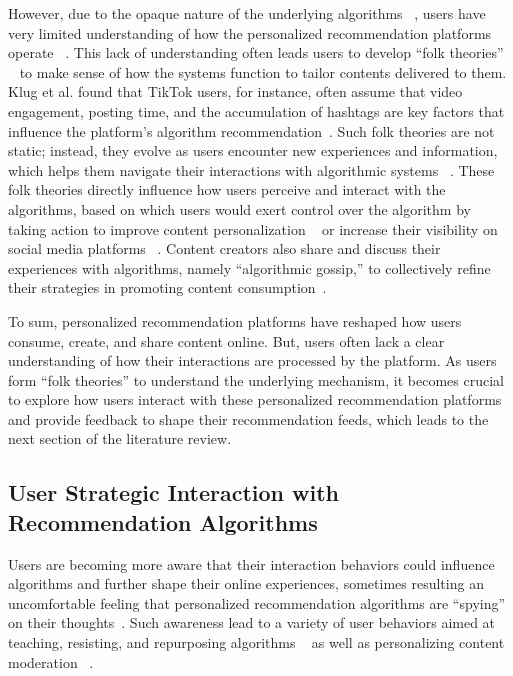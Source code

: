 However, due to the opaque nature of the underlying algorithms ~\cite{gillespie2014relevance, pasquale2011restoring}, users have very limited understanding of how the personalized recommendation platforms operate ~\cite{eslami2015always}. This lack of understanding often leads users to develop ``folk theories'' ~\cite{devito2017algorithms, eslami2016first, ngo2022exploring, bucher2016algorithmic} to make sense of how the systems function to tailor contents delivered to them. Klug et al. found that TikTok users, for instance, often assume that video engagement, posting time, and the accumulation of hashtags are key factors that influence the platform's algorithm recommendation~\cite{klug2021trick}. Such folk theories are not static; instead, they evolve as users encounter new experiences and information, which helps them navigate their interactions with algorithmic systems ~\cite{devito2018people}. These folk theories directly influence how users perceive and interact with the algorithms, based on which users would exert control over the algorithm by taking action to improve content personalization ~\cite{haupt2023recommending} or increase their visibility on social media platforms ~\cite{burrell2019users, bucher2018cleavage}. Content creators also share and discuss their experiences with algorithms, namely ``algorithmic gossip,'' to collectively refine their strategies in promoting content consumption~\cite{bishop2019managing}. 

To sum, personalized recommendation platforms have reshaped how users consume, create, and share content online. But, users often lack a clear understanding of how their interactions are processed by the platform. As users form ``folk theories'' to understand the underlying mechanism, it becomes crucial to explore how users interact with these personalized recommendation platforms and provide feedback to shape their recommendation feeds, which leads to the next section of the literature review.


\subsection{User Strategic Interaction with Recommendation Algorithms}
Users are becoming more aware that their interaction behaviors could influence algorithms and further shape their online experiences, sometimes resulting an uncomfortable feeling that personalized recommendation algorithms are ``spying'' on their thoughts~\cite{ellison2020we,klug2021trick}. Such awareness lead to a variety of user behaviors aimed at teaching, resisting, and repurposing algorithms ~\cite{kim2023investigating} as well as personalizing content moderation ~\cite{jhaver2023personalizing}. 

